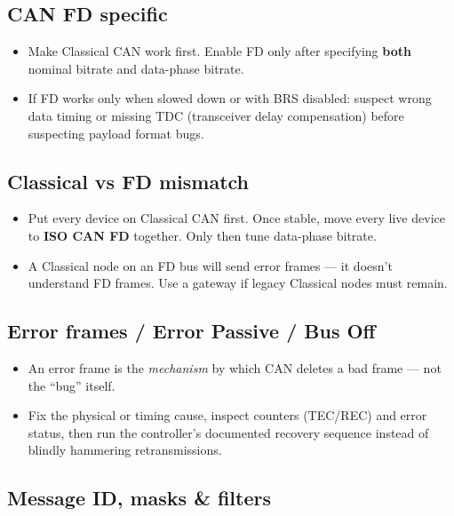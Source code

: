 \documentclass[12pt,a4paper,oneside]{report}
\providecommand{\tightlist}{\setlength{\itemsep}{0pt}\setlength{\parskip}{0pt}}
\begin{document}
\subsection{CAN FD specific}\label{can-fd-specific}

\begin{itemize}
\tightlist
\item
  Make Classical CAN work first. Enable FD only after specifying \textbf{both}
  nominal bitrate and data-phase bitrate.
\item
  If FD works only when slowed down or with BRS disabled: suspect wrong data
  timing or missing TDC (transceiver delay compensation) before suspecting
  payload format bugs.
\end{itemize}

\subsection{Classical vs FD mismatch}\label{classical-vs-fd-mismatch}

\begin{itemize}
\tightlist
\item
  Put every device on Classical CAN first. Once stable, move every live device
  to \textbf{ISO CAN FD} together. Only then tune data-phase bitrate.
\item
  A Classical node on an FD bus will send error frames --- it doesn't understand
  FD frames. Use a gateway if legacy Classical nodes must remain.
\end{itemize}

\subsection{Error frames / Error Passive / Bus
Off}\label{error-frames-error-passive-bus-off}

\begin{itemize}
\tightlist
\item
  An error frame is the \emph{mechanism} by which CAN deletes a bad frame ---
  not the ``bug'' itself.
\item
  Fix the physical or timing cause, inspect counters (TEC/REC) and error status,
  then run the controller's documented recovery sequence instead of blindly
  hammering retransmissions.
\end{itemize}

\subsection{Message ID, masks \& filters}\label{message-id-masks-filters}
\end{document}
